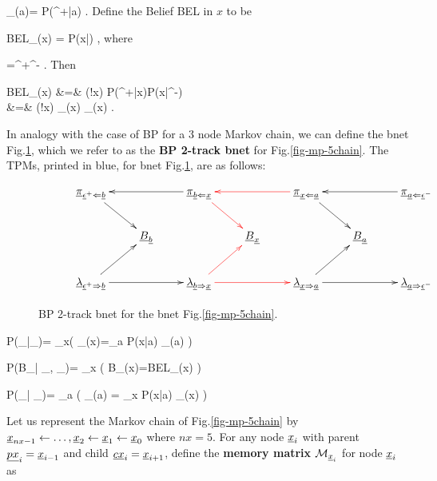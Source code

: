 \beq 
\lam_{\rvx\rdart \rva}(a)=
P(\eps^+|a)
\;.
\eeq
Define the Belief BEL in $x$ to be

\beq
BEL_\rvx(x)
=
P(x|\eps)
\;,
\eeq
where

\beq
\rveps=\rveps^+\cup\rveps^-
\;.
\eeq
Then


\beqa
BEL_\rvx(x)
&=&
\caln(!x)
P(\eps^+|x)P(x|\eps^-)
\\
&=&
\caln(!x)
\lam_{\rvb\rdart \rvx}(x)
\pi_{\rvb\ldart \rvx}(x)
\;.
\eeqa

In analogy
with the case of BP for a 3 node Markov
chain, we can define the bnet
Fig.\ref{fig-BEL-4pi},
which we refer to as the
{\bf BP
2-track bnet} for Fig.\ref{fig-mp-5chain}.
The TPMs, printed in blue,
 for bnet Fig.\ref{fig-BEL-4pi}, are
as follows:





\begin{figure}[h!]
$$\xymatrix{
&\ul{\pi}_{\rveps^+\ldart\rvb}\ar[dr]
&&\ul{\pi}_{\rvb\ldart\rvx}\ar[ll]\ar@[red][dr]
&&\ul{\pi}_{\rvx\ldart\rva}\ar@[red][ll]\ar[dr]
&&\ul{\pi}_{\rva\ldart\rveps^-}\ar[ll]
\\
&&\rvB_\rvb
&&\rvB_\rvx
&&\rvB_\rva
\\
&\ul{\lam}_{\rveps^+\rdart\rvb}\ar[rr]\ar[ur]
&&\ul{\lam}_{\rvb\rdart\rvx}\ar@[red][rr]\ar@[red][ur]
&&\ul{\lam}_{\rvx\rdart\rva}\ar[rr]\ar[ur]
&&\ul{\lam}_{\rva\rdart\rveps^-}
}$$
\caption{BP 2-track bnet for the bnet
Fig.\ref{fig-mp-5chain}.}
\label{fig-BEL-4pi}
\end{figure}


\beq\color{blue}
P(\pi_{\rvb\ldart\rvx}|\pi_{\rvx\ldart\rva})=
\prod_{x}\indi\left(
\pi_{\rvb\ldart\rvx}(x)=\sum_a P(x|a)
\pi_{\rvx\ldart\rva}(a)
\right)
\label{eq-pr-pi-bar-pi}
\eeq

\beq\color{blue}
P(B_\rvx|
\pi_{\rvb\ldart \rvx},
\lam_{\rvb\rdart \rvx})=
\prod_x
\indi\left(
B_\rvx(x)=BEL_\rvx(x)
\right)
\eeq

\beq\color{blue}
P(\lam_{\rvx\rdart \rva}|
\lam_{\rvb\rdart \rvx})=
\prod_{a}
\indi\left(
\lam_{\rvx\rdart \rva}(a)
=
\sum_x P(x|a)
\lam_{\rvb\rdart \rvx}(x)
\right)
\label{eq-pr-lam-bar-lam}
\eeq

Let us represent the Markov
chain of Fig.\ref{fig-mp-5chain}
by
${\underline{x}}_{nx-1}
\leftarrow \ldots, {\underline{x}}_2\leftarrow {\underline{x}}_1\leftarrow {\underline{x}}_0$
where $nx=5$.
For any node 
${\underline{x}}_i$
with
parent $\underline{px}_i={\underline{x}}_{i-1}$
and child $\underline{cx}_i={\underline{x}}_{i+1}$, 
define
the {\bf memory matrix}
${\cal M}_{{\underline{x}}_i}$
for node ${\underline{x}}_i$
as

